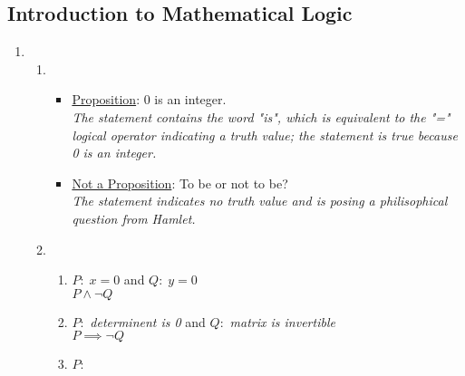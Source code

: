 \subsection*{Introduction to Mathematical Logic}
\begin{enumerate}
    \item 
    \begin{enumerate}[label=(\alph*), itemsep=16pt]
        \item 
        \begin{itemize}
            \item \underline{Proposition}: 0 is an integer. \\
                \textit{The statement contains the word "is", which is equivalent to the "=" logical operator indicating a truth value; the statement is true because 0 is an integer.}
            \item \underline{Not a Proposition}: To be or not to be? \\
                \textit{The statement indicates no truth value and is posing a philisophical question from Hamlet.}
        \end{itemize}

        \item
        \begin{enumerate}[label=(\roman*), itemsep=10pt]
            \item $P:\;x=0$ and $Q:\;y=0$ \\
            $P\land \neg Q$

            \item $P:$ \textit{determinent is 0} and $Q:$ \textit{matrix is invertible} \\
            $P \implies \neg Q$ 

            \item $P:\;$
        \end{enumerate}
    \end{enumerate}
\end{enumerate}

